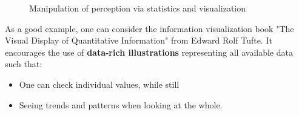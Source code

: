 \begin{note}
\begin{figure}[h]
  \caption{Manipulation of perception via statistics and visualization}
  \label{fig:2_manipulate_perception}
\end{figure}

As a good example, one can consider the information visualization book "The Visual Display of Quantitative Information" from Edward Rolf Tufte. It encourages the use of \textbf{data-rich illustrations} representing all available data such that:
\begin{itemize}
  \item One can check individual values, while still
  \item Seeing trends and patterns when looking at the whole.
\end{itemize}
\end{note}